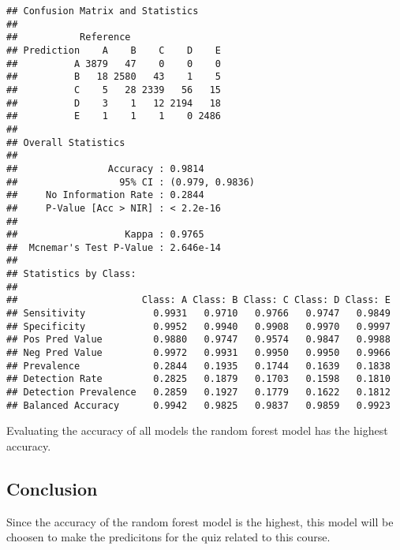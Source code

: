 \documentclass[]{article}
\begin{document}
\begin{verbatim}
## Confusion Matrix and Statistics
## 
##           Reference
## Prediction    A    B    C    D    E
##          A 3879   47    0    0    0
##          B   18 2580   43    1    5
##          C    5   28 2339   56   15
##          D    3    1   12 2194   18
##          E    1    1    1    0 2486
## 
## Overall Statistics
##                                          
##                Accuracy : 0.9814         
##                  95% CI : (0.979, 0.9836)
##     No Information Rate : 0.2844         
##     P-Value [Acc > NIR] : < 2.2e-16      
##                                          
##                   Kappa : 0.9765         
##  Mcnemar's Test P-Value : 2.646e-14      
## 
## Statistics by Class:
## 
##                      Class: A Class: B Class: C Class: D Class: E
## Sensitivity            0.9931   0.9710   0.9766   0.9747   0.9849
## Specificity            0.9952   0.9940   0.9908   0.9970   0.9997
## Pos Pred Value         0.9880   0.9747   0.9574   0.9847   0.9988
## Neg Pred Value         0.9972   0.9931   0.9950   0.9950   0.9966
## Prevalence             0.2844   0.1935   0.1744   0.1639   0.1838
## Detection Rate         0.2825   0.1879   0.1703   0.1598   0.1810
## Detection Prevalence   0.2859   0.1927   0.1779   0.1622   0.1812
## Balanced Accuracy      0.9942   0.9825   0.9837   0.9859   0.9923
\end{verbatim}

Evaluating the accuracy of all models the random forest model has the
highest accuracy.

\subsection{Conclusion}\label{conclusion}

Since the accuracy of the random forest model is the highest, this model
will be choosen to make the predicitons for the quiz related to this
course.
\end{document}
